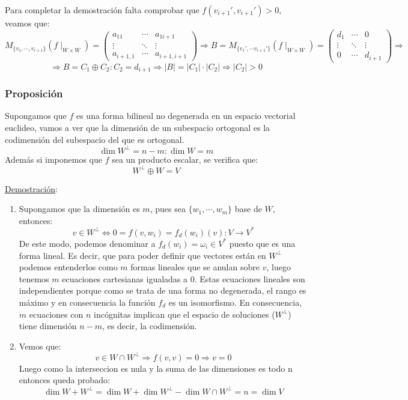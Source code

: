 \documentclass[10pt,a4paper,openright]{book}
\theoremstyle{break}
\begin{document}
\begin{itemize}
Para completar la demostración falta comprobar que $f(v_{i+1}',v_{i+1}')>0$, veamos que:
$$M_{\{v_1, \cdots, v_{i+1}\}}(f\mid_{W\times W}) = \begin{pmatrix} a_{11} & \cdots & a_{1i+1} \\ \vdots & \ddots & \vdots \\ a_{i+1,1} & \cdots & a_{i+1,i+1}\end{pmatrix}\Rightarrow B= M_{\{v_1', \cdots v_{i+1}'\}}(f\mid_{W\times W})=\begin{pmatrix} d_1 & \cdots & 0 \\ \vdots & \ddots & \vdots \\ 0 & \cdots & d_{i+1}\end{pmatrix}\Rightarrow$$
$$\Rightarrow B=C_1\oplus C_2: C_2 = d_{i+1}\Rightarrow |B| = |C_1| \cdot |C_2|\Rightarrow |C_2|>0$$
\end{itemize}

\subsubsection*{Proposición}
Supongamos que $f$ es una forma bilineal  no degenerada en un espacio vectorial euclideo, vamos a ver que la dimensión de un subespacio ortogonal es la codimensión del subespacio del que es ortogonal.
$$\dim W^\perp = n-m: \dim W = m$$
Además si imponemos que $f$ sea un producto escalar, se verifica que:
$$W^\perp \oplus W = V$$

\underline{Demostración}:
\begin{enumerate}
\item Supongamos que la dimensión es $m$, pues sea $\{w_1, \cdots, w_m\}$ base de $W$, entonces:
$$v\in W^\perp\Leftrightarrow 0 = f(v,w_i) = f_d(w_i)(v): V\rightarrow V^*$$
De este modo, podemos denominar a $f_d(w_i)=\omega_i\in V^*$ puesto que es una forma lineal. Es decir, que para poder definir que vectores están en $W^\perp$ podemos entenderlos como $m$ formas lineales que se anulan sobre $v$, luego tenemos $m$ ecuaciones cartesianas igualadas a 0. Estas ecuaciones lineales son independientes porque como se trata de una forma no degenerada, el rango es máximo y en consecuencia la función $f_d$ es un isomorfismo. En consecuencia, $m$ ecuaciones con $n$ incógnitas implican que el espacio de soluciones ($W^\perp$) tiene dimensión $n-m$, es decir, la codimensión.

\item Vemos que:
$$v\in W\cap W^\perp \Rightarrow f(v,v)=0\Rightarrow v = 0$$
Luego como la interseccion es nula y la suma de las dimensiones es todo n entonces queda probado:
$$\dim W+W^\perp = \dim W + \dim W^\perp -\dim W\cap W^\perp = n = \dim V$$

\end{enumerate}
\end{document}
